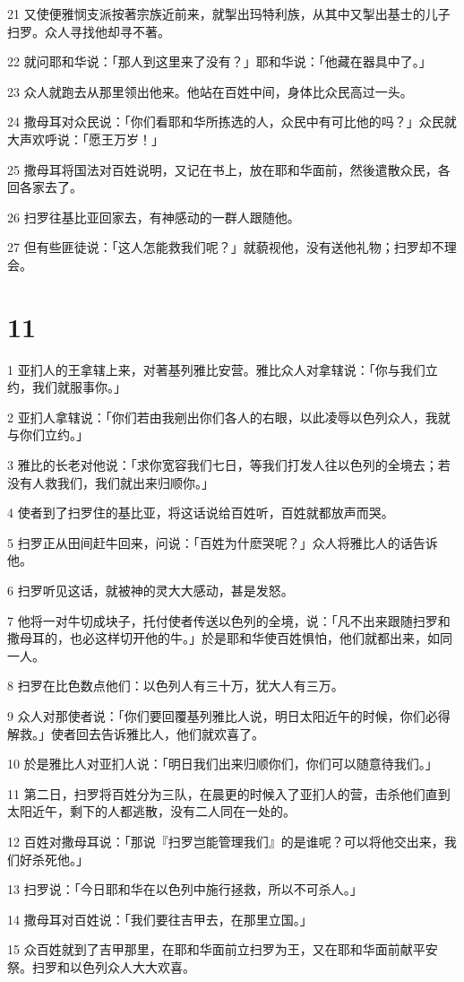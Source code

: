 \par 21 又使便雅悯支派按著宗族近前来，就掣出玛特利族，从其中又掣出基士的儿子扫罗。众人寻找他却寻不著。
\par 22 就问耶和华说：「那人到这里来了没有？」耶和华说：「他藏在器具中了。」
\par 23 众人就跑去从那里领出他来。他站在百姓中间，身体比众民高过一头。
\par 24 撒母耳对众民说：「你们看耶和华所拣选的人，众民中有可比他的吗？」众民就大声欢呼说：「愿王万岁！」
\par 25 撒母耳将国法对百姓说明，又记在书上，放在耶和华面前，然後遣散众民，各回各家去了。
\par 26 扫罗往基比亚回家去，有神感动的一群人跟随他。
\par 27 但有些匪徒说：「这人怎能救我们呢？」就藐视他，没有送他礼物；扫罗却不理会。

\chapter{11}

\par 1 亚扪人的王拿辖上来，对著基列雅比安营。雅比众人对拿辖说：「你与我们立约，我们就服事你。」
\par 2 亚扪人拿辖说：「你们若由我剜出你们各人的右眼，以此凌辱以色列众人，我就与你们立约。」
\par 3 雅比的长老对他说：「求你宽容我们七日，等我们打发人往以色列的全境去；若没有人救我们，我们就出来归顺你。」
\par 4 使者到了扫罗住的基比亚，将这话说给百姓听，百姓就都放声而哭。
\par 5 扫罗正从田间赶牛回来，问说：「百姓为什麽哭呢？」众人将雅比人的话告诉他。
\par 6 扫罗听见这话，就被神的灵大大感动，甚是发怒。
\par 7 他将一对牛切成块子，托付使者传送以色列的全境，说：「凡不出来跟随扫罗和撒母耳的，也必这样切开他的牛。」於是耶和华使百姓惧怕，他们就都出来，如同一人。
\par 8 扫罗在比色数点他们：以色列人有三十万，犹大人有三万。
\par 9 众人对那使者说：「你们要回覆基列雅比人说，明日太阳近午的时候，你们必得解救。」使者回去告诉雅比人，他们就欢喜了。
\par 10 於是雅比人对亚扪人说：「明日我们出来归顺你们，你们可以随意待我们。」
\par 11 第二日，扫罗将百姓分为三队，在晨更的时候入了亚扪人的营，击杀他们直到太阳近午，剩下的人都逃散，没有二人同在一处的。
\par 12 百姓对撒母耳说：「那说『扫罗岂能管理我们』的是谁呢？可以将他交出来，我们好杀死他。」
\par 13 扫罗说：「今日耶和华在以色列中施行拯救，所以不可杀人。」
\par 14 撒母耳对百姓说：「我们要往吉甲去，在那里立国。」
\par 15 众百姓就到了吉甲那里，在耶和华面前立扫罗为王，又在耶和华面前献平安祭。扫罗和以色列众人大大欢喜。

